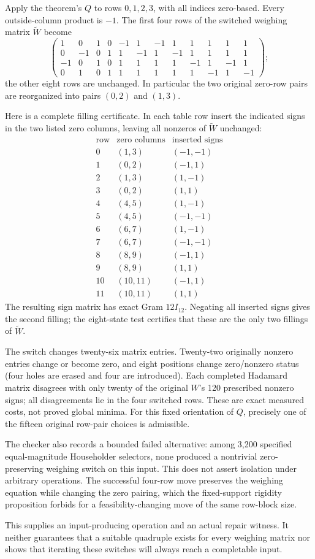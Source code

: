 Apply the theorem's $Q$ to rows $0,1,2,3$, with all indices zero-based.
Every outside-column product is $-1$. The first four rows of the
switched weighing matrix $\widetilde W$ become
\[
\begin{pmatrix}
1&0&1&0&-1&1&-1&1&1&1&1&1\\
0&-1&0&1&1&-1&1&-1&1&1&1&1\\
-1&0&1&0&1&1&1&1&-1&1&-1&1\\
0&1&0&1&1&1&1&1&1&-1&1&-1
\end{pmatrix};
\]
the other eight rows are unchanged. In particular the two original
zero-row pairs are reorganized into pairs $(0,2)$ and $(1,3)$.

Here is a complete filling certificate. In each table row insert
the indicated signs in the two listed zero columns, leaving all
nonzeros of $\widetilde W$ unchanged:
\[
\begin{array}{c|c|c}
\text{row}&\text{zero columns}&\text{inserted signs}\\\hline
0&(1,3)&(-1,-1)\\1&(0,2)&(-1,1)\\
2&(1,3)&(1,-1)\\3&(0,2)&(1,1)\\
4&(4,5)&(1,-1)\\5&(4,5)&(-1,-1)\\
6&(6,7)&(1,-1)\\7&(6,7)&(-1,-1)\\
8&(8,9)&(-1,1)\\9&(8,9)&(1,1)\\
10&(10,11)&(-1,1)\\11&(10,11)&(1,1)
\end{array}
\]
The resulting sign matrix has exact Gram $12I_{12}$. Negating
all inserted signs gives the second filling; the eight-state test
certifies that these are the only two fillings of $\widetilde W$.

The switch changes twenty-six matrix entries. Twenty-two originally
nonzero entries change or become zero, and eight positions change
zero/nonzero status (four holes are erased and four are introduced).
Each completed Hadamard matrix disagrees with only twenty of the
original $W$'s 120 prescribed nonzero signs; all disagreements lie
in the four switched rows. These are exact measured costs, not
proved global minima. For this fixed orientation of $Q$, precisely
one of the fifteen original row-pair choices is admissible.

The checker also records a bounded failed alternative: among 3,200
specified equal-magnitude Householder selectors, none produced a
nontrivial zero-preserving weighing switch on this input. This does
not assert isolation under arbitrary operations. The successful
four-row move preserves the weighing equation while changing the
zero pairing, which the fixed-support rigidity proposition forbids
for a feasibility-changing move of the same row-block size.

This supplies an input-producing operation and an actual repair
witness. It neither guarantees that a suitable quadruple exists
for every weighing matrix nor shows that iterating these switches
will always reach a completable input.
